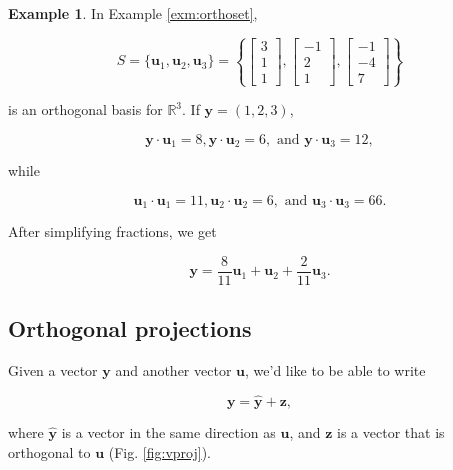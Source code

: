 \documentclass[
]{book}
\theoremstyle{definition}
\theoremstyle{definition}
\newtheorem{example}{Example}[chapter]
\theoremstyle{definition}
\theoremstyle{definition}
\theoremstyle{remark}
\begin{document}
\begin{examplebox}

\begin{example}
In Example \ref{exm:orthoset},

\[S=\{\mathbf{u}_1,\mathbf{u}_2,\mathbf{u}_3\}=\left\{\begin{bmatrix}3\\1\\1\end{bmatrix},\begin{bmatrix}-1\\2\\1\end{bmatrix},\begin{bmatrix}-1\\-4\\7\end{bmatrix}\right\}\]

is an orthogonal basis for \(\mathbb{R}^3\). If \(\mathbf{y}=(1,2,3)\),

\[\mathbf{y}\cdot \mathbf{u}_1=8,\mathbf{y}\cdot \mathbf{u}_2=6, \text{ and } \mathbf{y}\cdot \mathbf{u}_3=12,\]

while

\[\mathbf{u}_1\cdot \mathbf{u}_1=11,\mathbf{u}_2\cdot\mathbf{u}_2=6,\text{ and }\mathbf{u}_3\cdot\mathbf{u}_3=66.\]

After simplifying fractions, we get

\[\mathbf{y}=\frac{8}{11}\mathbf{u}_1+\mathbf{u}_2+\frac{2}{11}\mathbf{u}_3.\]
\end{example}

\end{examplebox}

\subsection*{Orthogonal projections}\label{orthogonal-projections}

Given a vector \(\mathbf{y}\) and another vector \(\mathbf{u}\), we'd like to be able to write

\[\mathbf{y}=\hat{\mathbf{y}}+\mathbf{z},\]

where \(\hat{\mathbf{y}}\) is a vector in the same direction as \(\mathbf{u}\), and \(\mathbf{z}\) is a vector that is orthogonal to \(\mathbf{u}\) (Fig. \ref{fig:vproj}).
\end{document}
